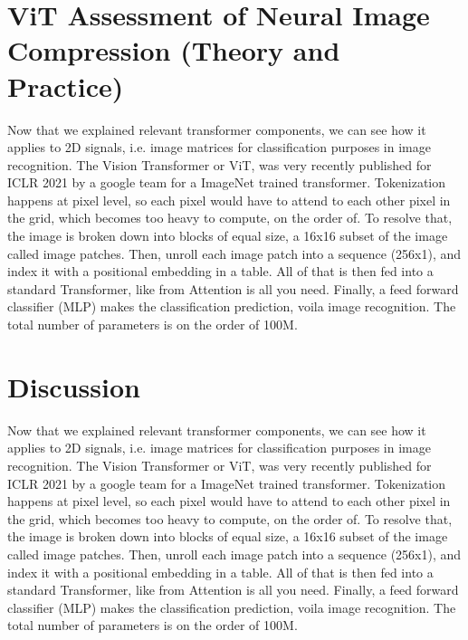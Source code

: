 \documentclass[pdftex,11pt,titlepage,twoside,openright]{report}
\begin{document}
\chapter{ViT Assessment of Neural Image Compression (Theory and Practice)}

Now that we explained relevant transformer components, we can see how it applies to 2D signals, i.e. image matrices for classification purposes in image recognition.
The Vision Transformer or ViT, was very recently published for ICLR 2021 by a google team for a ImageNet trained transformer.
Tokenization happens at pixel level, so each pixel would have to attend to  each other pixel in the grid, which becomes too heavy to compute, on the order of. 
To resolve that, the image is broken down into blocks of equal size, a 16x16 subset of the image called image patches. Then, unroll each image patch into a sequence (256x1), and index it with a positional embedding in a table. All of that is then fed into a standard Transformer, like from Attention is all you need. Finally, a feed forward classifier (MLP) makes the classification prediction, voila image recognition.
The total number of parameters is on the order of 100M.

\newpage


\cleardoublepage
\chapter{Discussion}

Now that we explained relevant transformer components, we can see how it applies to 2D signals, i.e. image matrices for classification purposes in image recognition.
The Vision Transformer or ViT, was very recently published for ICLR 2021 by a google team for a ImageNet trained transformer.
Tokenization happens at pixel level, so each pixel would have to attend to  each other pixel in the grid, which becomes too heavy to compute, on the order of. 
To resolve that, the image is broken down into blocks of equal size, a 16x16 subset of the image called image patches. Then, unroll each image patch into a sequence (256x1), and index it with a positional embedding in a table. All of that is then fed into a standard Transformer, like from Attention is all you need. Finally, a feed forward classifier (MLP) makes the classification prediction, voila image recognition.
The total number of parameters is on the order of 100M.

\newpage

\end{document}
